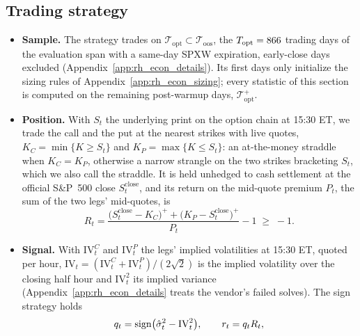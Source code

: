\subsection{Trading strategy}
\label{sec:rh_econ_strategy}
\begin{itemize}
\item \textbf{Sample.} The strategy trades on $\mathcal T_{\mathrm{opt}} \subset \mathcal T_{\mathrm{oos}}$, the
  $T_{\mathrm{opt}} = 866$ trading days of the evaluation span with a same-day SPXW expiration, early-close days
  excluded (Appendix~\ref{app:rh_econ_details}). Its first \rheSzWarmup{} days only initialize the sizing rules of
  Appendix~\ref{app:rh_econ_sizing}; every statistic of this section is computed on the remaining \rheSzDays{}
  post-warmup days, $\mathcal T_{\mathrm{opt}}^{+}$.
\item \textbf{Position.} With $S_t$ the underlying print on the option chain at 15:30 ET, we trade the call and the
  put at the nearest strikes with live quotes, $K_C = \min\{K \ge S_t\}$ and $K_P = \max\{K \le S_t\}$: an
  at-the-money straddle when $K_C = K_P$, otherwise a narrow strangle on the two strikes bracketing $S_t$, which we
  also call the straddle. It is held unhedged to cash settlement at the official S\&P~500 close
  $S^{\mathrm{close}}_t$, and its return on the mid-quote premium $P_t$, the sum of the two legs' mid-quotes, is
  \[
    R_t = \frac{\bigl(S^{\mathrm{close}}_t - K_C\bigr)^+ + \bigl(K_P - S^{\mathrm{close}}_t\bigr)^+}{P_t} - 1
      \;\ge\; -1 .
  \]
\item \textbf{Signal.} With $\mathrm{IV}^C_t$ and $\mathrm{IV}^P_t$ the legs' implied volatilities at 15:30 ET, quoted
  per hour, $\mathrm{IV}_t = (\mathrm{IV}^C_t + \mathrm{IV}^P_t)/(2\sqrt2)$ is the implied volatility over the closing
  half hour and $\mathrm{IV}_t^2$ its implied variance (Appendix~\ref{app:rh_econ_details} treats the vendor's
  failed solves). The sign strategy holds
  \[
    q_t = \operatorname{sign}\bigl(\hat\sigma^2_t - \mathrm{IV}_t^2\bigr), \qquad r_t = q_t R_t ,
\]
\end{itemize}
